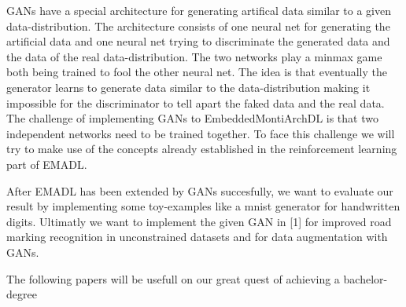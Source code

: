 \documentclass[12pt, a4paper]{scrartcl}
\begin{document}
\bigskip

GANs have a special architecture for generating artifical data similar to a given data-distribution.
The architecture consists of one neural net for generating the artificial data and one neural net
trying to discriminate the generated data and the data of the real data-distribution. The two
networks play a minmax game both being trained to fool the other neural net. The idea is that
eventually the generator learns to generate data similar to the data-distribution making it
impossible for the discriminator to tell apart the faked data and the real data. The challenge of
implementing GANs to EmbeddedMontiArchDL is that two independent networks need to be trained
together. To face this challenge we will try to make use of the concepts already established in the
reinforcement learning part of EMADL.

\smallskip

After EMADL has been extended by GANs succesfully, we want to evaluate our result by implementing
some toy-examples like a mnist generator for handwritten digits. Ultimatly we want to
implement the given GAN in [1] for improved road marking recognition in unconstrained datasets and
for data augmentation with GANs.

\bigskip

The following papers will be usefull on our great quest of achieving a bachelor-degree


\end{document}
